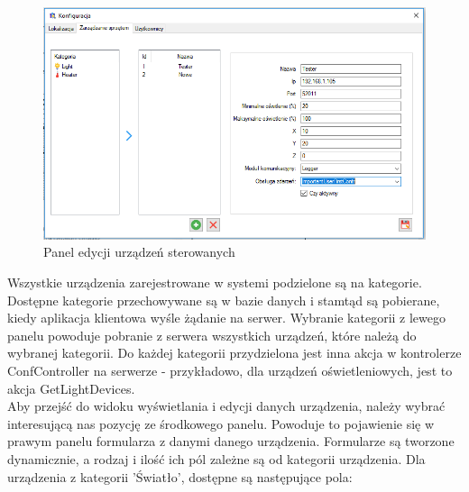 \begin{figure}[H]			
	\centering
	\caption{Panel edycji urządzeń sterowanych}
	\includegraphics[width=1.0\textwidth]{panel_konf_ster}
\end{figure}
Wszystkie urządzenia zarejestrowane w systemi podzielone są na kategorie. Dostępne kategorie przechowywane są w bazie danych i stamtąd są pobierane, kiedy aplikacja klientowa wyśle żądanie na serwer. Wybranie kategorii z lewego panelu powoduje pobranie z serwera wszystkich urządzeń, które należą do wybranej kategorii. Do każdej kategorii przydzielona jest inna akcja w kontrolerze ConfController na serwerze - przykładowo, dla urządzeń oświetleniowych, jest to akcja GetLightDevices.\\
Aby przejść do widoku wyświetlania i edycji danych urządzenia, należy wybrać interesującą nas pozycję ze środkowego panelu. Powoduje to pojawienie się w prawym panelu formularza z danymi danego urządzenia. Formularze są tworzone dynamicznie, a rodzaj i ilość ich pól zależne są od kategorii urządzenia. Dla urządzenia z kategorii 'Światło', dostępne są następujące pola:
